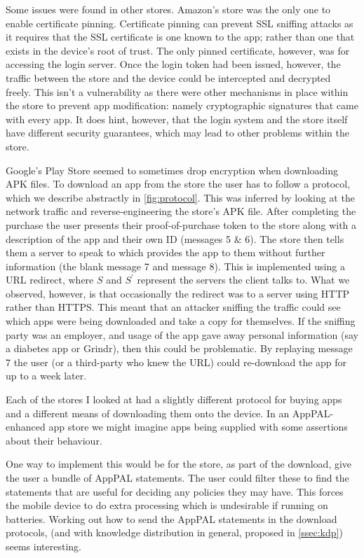 \documentclass[a4paper]{scrartcl}
\begin{document}
Some issues were found in other stores.
Amazon's store was the only one to enable certificate pinning.
Certificate pinning can prevent SSL sniffing attacks as it requires that the SSL certificate is one known to the app; rather than one that exists in the device's root of trust.
The only pinned certificate, however, was for accessing the login server.
Once the login token had been issued, however, the traffic between the store and the device could be intercepted and decrypted freely.
This isn't a vulnerability as there were other mechanisms in place within the store to prevent app modification: namely cryptographic signatures that came with every app.
It does hint, however, that the login system and the store itself have different security guarantees, which may lead to other problems within the store.

Google's Play Store seemed to sometimes drop encryption when downloading APK files.
To download an app from the store the user has to follow a protocol, which we describe abstractly in \autoref{fig:protocol}.
This was inferred by looking at the network traffic and reverse-engineering the store's APK file.
After completing the purchase the user presents their proof-of-purchase token to the store along with a description of the app and their own ID (messages 5 \& 6).
The store then tells them a server to speak to which provides the app to them without further information (the blank message 7 and message 8).
This is implemented using a URL redirect, where $S$ and $S^\prime$ represent the servers the client talks to.
What we observed, however, is that occasionally the redirect was to a server using HTTP rather than HTTPS.
This meant that an attacker sniffing the traffic could see which apps were being downloaded and take a copy for themselves.
If the sniffing party was an employer, and usage of the app gave away personal information (say a diabetes app or Grindr), then this could be problematic.
By replaying message 7 the user (or a third-party who knew the URL) could re-download the app for up to a week later.

Each of the stores I looked at had a slightly different protocol for buying apps and a different means of downloading them onto the device.
In an AppPAL-enhanced app store we might imagine apps being supplied with some assertions about their behaviour.

One way to implement this would be for the store, as part of the download, give the user a bundle of AppPAL statements.
The user could filter these to find the statements that are useful for deciding any policies they may have.
This forces the mobile device to do extra processing which is undesirable if running on batteries.
Working out how to send the AppPAL statements in the download protocols, (and with knowledge distribution in general, proposed in \autoref{ssec:kdp}) seems interesting.
\end{document}

